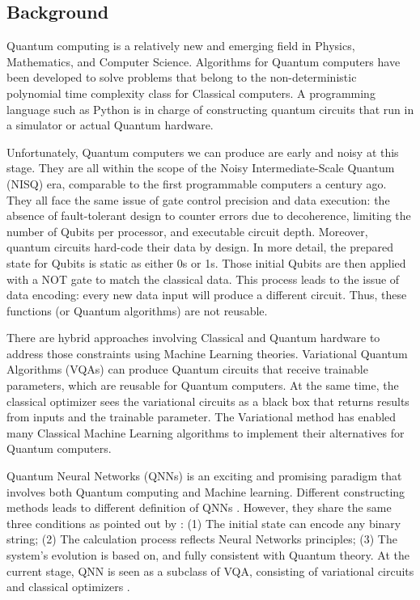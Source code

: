 \subsection{Background}\label{Background Section}
Quantum computing is a relatively new and emerging field in Physics, Mathematics, and Computer Science. 
Algorithms for Quantum computers have been developed to solve problems that belong to the non-deterministic polynomial time complexity class for Classical computers. 
A programming language such as Python is in charge of constructing quantum circuits that run in a simulator or actual Quantum hardware. 

Unfortunately, Quantum computers we can produce are early and noisy at this stage. 
They are all within the scope of the Noisy Intermediate-Scale Quantum (NISQ) era, comparable to the first programmable computers a century ago. 
They all face the same issue of gate control precision and data execution: the absence of fault-tolerant design to counter errors due to decoherence, limiting the number of Qubits per processor, and executable circuit depth. 
Moreover, quantum circuits hard-code their data by design. In more detail, the prepared state for Qubits is static as either 0s or 1s. 
Those initial Qubits are then applied with a NOT gate to match the classical data. This process leads to the issue of data encoding: every new data input will produce a different circuit. 
Thus, these functions (or Quantum algorithms) are not reusable.

There are hybrid approaches involving Classical and Quantum hardware to address those constraints using Machine Learning theories. 
Variational Quantum Algorithms (VQAs) can produce Quantum circuits that receive trainable parameters, which are reusable for Quantum computers. 
At the same time, the classical optimizer sees the variational circuits as a black box that returns results from inputs and the trainable parameter. 
The Variational method has enabled many Classical Machine Learning algorithms to implement their alternatives for Quantum computers.

Quantum Neural Networks (QNNs) \cite{altaisky2001quantum} is an exciting and promising paradigm that involves both Quantum computing and Machine learning. 
Different constructing methods leads to different definition of QNNs \cite{paetznick2013} \cite{zhaoBuildingQuantumNeural2019} \cite{caoQuantumNeuronElementary2017}. 
However, they share the same three conditions as pointed out by \cite{schuldQuestQuantumNeural2014}: 
(1) The initial state can encode any binary string;
(2) The calculation process reflects Neural Networks principles;
(3) The system's evolution is based on, and fully consistent with Quantum theory.
At the current stage, QNN is seen as a subclass of VQA, consisting of variational circuits and classical optimizers \cite{abbasPowerQuantumNeural2021}.

